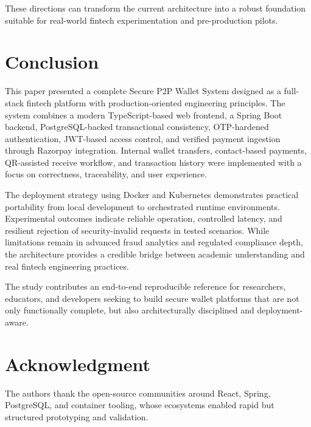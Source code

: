 \documentclass[conference]{IEEEtran}
\begin{document}
These directions can transform the current architecture into a robust foundation suitable for real-world fintech experimentation and pre-production pilots.

\section{Conclusion}
This paper presented a complete Secure P2P Wallet System designed as a full-stack fintech platform with production-oriented engineering principles. The system combines a modern TypeScript-based web frontend, a Spring Boot backend, PostgreSQL-backed transactional consistency, OTP-hardened authentication, JWT-based access control, and verified payment ingestion through Razorpay integration. Internal wallet transfers, contact-based payments, QR-assisted receive workflow, and transaction history were implemented with a focus on correctness, traceability, and user experience.

The deployment strategy using Docker and Kubernetes demonstrates practical portability from local development to orchestrated runtime environments. Experimental outcomes indicate reliable operation, controlled latency, and resilient rejection of security-invalid requests in tested scenarios. While limitations remain in advanced fraud analytics and regulated compliance depth, the architecture provides a credible bridge between academic understanding and real fintech engineering practices.

The study contributes an end-to-end reproducible reference for researchers, educators, and developers seeking to build secure wallet platforms that are not only functionally complete, but also architecturally disciplined and deployment-aware.

\section*{Acknowledgment}
The authors thank the open-source communities around React, Spring, PostgreSQL, and container tooling, whose ecosystems enabled rapid but structured prototyping and validation.
\end{document}
